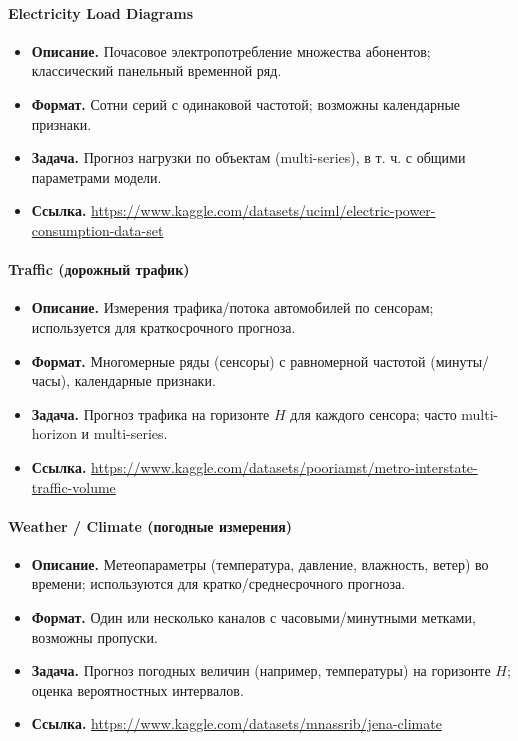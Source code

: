 \documentclass[12pt,a4paper]{article}
\begin{document}
\paragraph{Electricity Load Diagrams}
\begin{itemize}
  \item \textbf{Описание.} Почасовое электропотребление множества абонентов; классический панельный временной ряд.
  \item \textbf{Формат.} Сотни серий с одинаковой частотой; возможны календарные признаки.
  \item \textbf{Задача.} Прогноз нагрузки по объектам (multi-series), в т. ч. с общими параметрами модели.
  \item \textbf{Ссылка.} \href{https://www.kaggle.com/datasets/uciml/electric-power-consumption-data-set}{https://www.kaggle.com/datasets/uciml/electric-power-consumption-data-set}
\end{itemize}

\paragraph{Traffic (дорожный трафик)}
\begin{itemize}
  \item \textbf{Описание.} Измерения трафика/потока автомобилей по сенсорам; используется для краткосрочного прогноза.
  \item \textbf{Формат.} Многомерные ряды (сенсоры) с равномерной частотой (минуты/часы), календарные признаки.
  \item \textbf{Задача.} Прогноз трафика на горизонте $H$ для каждого сенсора; часто multi-horizon и multi-series.
  \item \textbf{Ссылка.} \href{https://www.kaggle.com/datasets/pooriamst/metro-interstate-traffic-volume}{https://www.kaggle.com/datasets/pooriamst/metro-interstate-traffic-volume}
\end{itemize}

\paragraph{Weather / Climate (погодные измерения)}
\begin{itemize}
  \item \textbf{Описание.} Метеопараметры (температура, давление, влажность, ветер) во времени; используются для кратко/среднесрочного прогноза.
  \item \textbf{Формат.} Один или несколько каналов с часовыми/минутными метками, возможны пропуски.
  \item \textbf{Задача.} Прогноз погодных величин (например, температуры) на горизонте $H$; оценка вероятностных интервалов.
  \item \textbf{Ссылка.} \href{https://www.kaggle.com/datasets/mnassrib/jena-climate}{https://www.kaggle.com/datasets/mnassrib/jena-climate}
\end{itemize}
\end{document}
